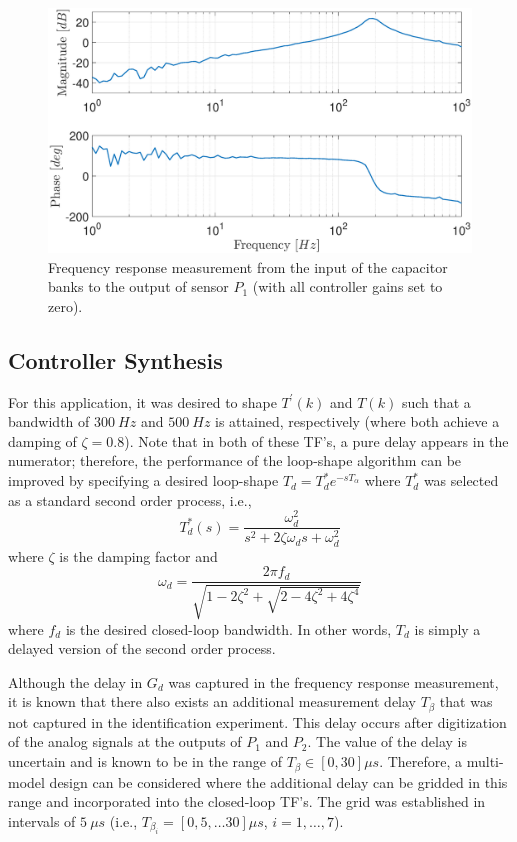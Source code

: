 \documentclass[a4paper, 10pt, conference]{ieeeconf}
\begin{document}
\begin{figure}
\centering
\includegraphics[width=\columnwidth]{../pics/GHP1.eps}
\caption{Frequency response measurement from the input of the capacitor banks to the output of sensor $P_1$ (with all controller gains set to zero).}
\label{fig:GHP1}
\end{figure} 

\subsection{Controller Synthesis}
For this application, it was desired to shape $T^{\prime}(k)$ and $T(k)$ such that a bandwidth of $300 \: Hz$ and $500 \: Hz$ is attained, respectively (where both achieve a damping of $\zeta = 0.8$). Note that in both of these TF's, a pure delay appears in the numerator; therefore, the performance of the loop-shape algorithm can be improved by specifying a desired loop-shape $T_d = T_d^*e^{-sT_\alpha}$ where $T_d^*$ was selected as a standard second order process, i.e.,
\begin{equation}
T_d^*(s) = \frac{\omega_d^2}{s^2 + 2\zeta \omega_d s + \omega_d^2}
\end{equation}
where $\zeta$ is the damping factor and
\begin{equation*}
\omega_d = \frac{2 \pi f_d}{\sqrt{1-2\zeta^2 + \sqrt{2-4\zeta^2 + 4\zeta^4}}}
\end{equation*}
where $f_d$ is the desired closed-loop bandwidth. In other words, $T_d$ is simply a delayed version of the second order process.

Although the delay in $G_d$ was captured in the frequency response measurement, it is known that there also exists an additional measurement delay $T_\beta$ that was not captured in the identification experiment. This delay occurs after digitization of the analog signals at the outputs of $P_1$ and $P_2$. The value of the delay is uncertain and is known to be in the range of $T_\beta \in [0,30]\mu s$. Therefore, a multi-model design can be considered where the additional delay can be gridded in this range and incorporated into the closed-loop TF's. The grid was established in intervals of $5 \: \mu s$ (i.e., $T_{\beta_i} = [0,5,\ldots30] \mu s$, $i = 1,\ldots,7$).  
\end{document}
